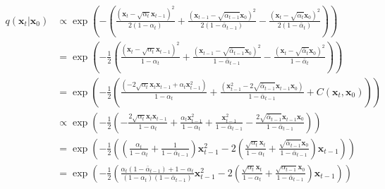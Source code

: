 \begin{align}
    q(\bm{x}_t|\bm{x}_{0}) & \propto \exp \left( -\left(\frac{\left(\bm{x}_{t}-\sqrt{\alpha_{t}} \bm{x}_{t-1}\right)^{2}}{2\left(1-\alpha_{t}\right)}+\frac{\left(\bm{x}_{t-1}-\sqrt{\bar{\alpha}_{t-1}} \bm{x}_{0}\right)^{2}}{2\left(1-\bar{\alpha}_{t-1}\right)}-\frac{\left(\bm{x}_{t}-\sqrt{\bar{\alpha}_{t}} \bm{x}_{0}\right)^{2}}{2\left(1-\bar{\alpha}_{t}\right)}\right) \right)                                                     \\
                           & =\exp \left(-\frac{1}{2}\left(\frac{\left(\bm{x}_{t}-\sqrt{\alpha_{t}} \bm{x}_{t-1}\right)^{2}}{1-\alpha_{t}}+\frac{\left(\bm{x}_{t-1}-\sqrt{\bar{\alpha}_{t-1}} \bm{x}_{0}\right)^{2}}{1-\bar{\alpha}_{t-1}}-\frac{\left(\bm{x}_{t}-\sqrt{\bar{\alpha}_{t}} \bm{x}_{0}\right)^{2}}{1-\bar{\alpha}_{t}}\right)\right)                                                                                             \\
                           & =\exp \left(-\frac{1}{2}\left(\frac{\left(-2 \sqrt{\alpha_{t}} \bm{x}_{t} \bm{x}_{t-1}+\alpha_{t} \bm{x}_{t-1}^{2}\right)}{1-\alpha_{t}}+\frac{\left(\bm{x}_{t-1}^{2}-2 \sqrt{\bar{\alpha}_{t-1}} \bm{x}_{t-1} \bm{x}_{0}\right)}{1-\bar{\alpha}_{t-1}}+C\left(\bm{x}_{t}, \bm{x}_{0}\right)\right)\right)                                                                                                        \\
                           & \propto \exp \left(-\frac{1}{2}\left(-\frac{2 \sqrt{\alpha_{t}} \bm{x}_{t} \bm{x}_{t-1}}{1-\alpha_{t}}+\frac{\alpha_{t} \bm{x}_{t-1}^{2}}{1-\alpha_{t}}+\frac{\bm{x}_{t-1}^{2}}{1-\bar{\alpha}_{t-1}}-\frac{2 \sqrt{\bar{\alpha}_{t-1}} \bm{x}_{t-1} \bm{x}_{0}}{1-\bar{\alpha}_{t-1}}\right)\right)                                                                                                              \\
                           & =\exp \left(-\frac{1}{2}\left(\left(\frac{\alpha_{t}}{1-\alpha_{t}}+\frac{1}{1-\bar{\alpha}_{t-1}}\right) \bm{x}_{t-1}^{2}-2\left(\frac{\sqrt{\alpha_{t}} \bm{x}_{t}}{1-\alpha_{t}}+\frac{\sqrt{\bar{\alpha}_{t-1}} \bm{x}_{0}}{1-\bar{\alpha}_{t-1}}\right) \bm{x}_{t-1}\right)\right)                                                                                                                           \\
                           & =\exp \left(-\frac{1}{2}\left(\frac{\alpha_{t}\left(1-\bar{\alpha}_{t-1}\right)+1-\alpha_{t}}{\left(1-\alpha_{t}\right)\left(1-\bar{\alpha}_{t-1}\right)} \bm{x}_{t-1}^{2}-2\left(\frac{\sqrt{\alpha_{t}} \bm{x}_{t}}{1-\alpha_{t}}+\frac{\sqrt{\alpha_{t-1}} \bm{x}_{0}}{1-\bar{\alpha}_{t-1}}\right) \bm{x}_{t-1}\right)\right)                                                                                 \\

\end{align}
